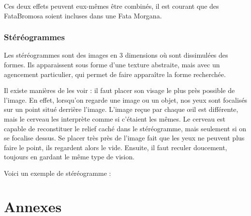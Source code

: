 \documentclass[a4paper, 12pt, onecolumn, openany]{report}
\begin{document}
Ces deux effets peuvent eux-mêmes être combinés, il est courant que des FataBromosa soient incluses dans une Fata Morgana. 

	\section{Stéréogrammes}
	Les stéréogrammes sont des images en 3 dimensions où sont dissimulées des formes. Ils apparaissent sous forme d’une texture abstraite, mais avec un agencement particulier, qui permet de faire apparaître la forme recherchée.
	
	Il existe manières de les voir : il faut placer son visage le plus près possible de l’image. En effet, lorsqu’on regarde une image ou un objet, nos yeux sont focalisés sur un point situé derrière l’image. L’image reçue par chaque œil est différente, mais le cerveau les interprète comme si c’étaient les mêmes. Le cerveau est capable de reconstituer le relief caché dans le stéréogramme, mais seulement si on se focalise dessus. Se placer très près de l’image fait que les yeux ne peuvent plus faire le point, ils regardent alors le vide. Ensuite, il faut reculer doucement, toujours en gardant le même type de vision. 
	
	Voici un exemple de stéréogramme :
	
\part*{Annexes}
\listoffigures
\end{document}
